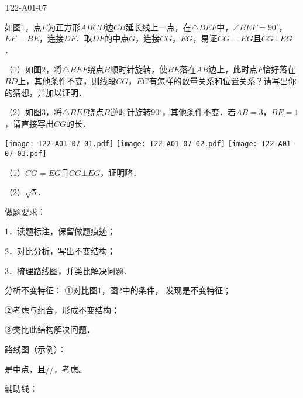 \begin{defproblem}{T22-A01-07}%
\begin{onlyproblem}%
如图1，点$E$为正方形$ABCD$边$ CB$延长线上一点，在$\triangle BEF$中，$\angle BEF=90^{\circ }$，$EF=BE$，连接$DF$．取$DF$的中点$G$，连接$CG$，$EG$，易证$CG=EG$且$CG\bot EG$．

（1）如图2，将$\triangle BEF$绕点$B$顺时针旋转，使$BE$落在$AB$边上，此时点$F$恰好落在$BD$上，其他条件不变，则线段$CG$，$EG$有怎样的数量关系和位置关系？请写出你的猜想，并加以证明．

（2）如图3，将$\triangle BEF$绕点$B$逆时针旋转90$^{\circ }$，其他条件不变．若$AB=3$，$BE=1$，请直接写出$CG$的长．

\begin{center}
\texttt{[image: T22-A01-07-01.pdf]}\qquad
\texttt{[image: T22-A01-07-02.pdf]}\qquad
\texttt{[image: T22-A01-07-03.pdf]}
\end{center}



\end{onlyproblem}%
\begin{onlysolution}%
（1）$CG=EG$且$CG \bot  EG$，证明略．

（2）$\sqrt 5 $．

做题要求：

1．读题标注，保留做题痕迹；

2．对比分析，写出不变结构；

3．梳理路线图，并类比解决问题．

分析不变特征：
①对比图1，图2中的条件，
发现\underline{\hspace*{2cm}}是不变特征；

②考虑\underline{\hspace*{2cm}}与\underline{\hspace*{2cm}}组合，形成不变结构；

③类比此结构解决问题．

路线图（示例）：

\underline{\hspace*{2cm}}是中点，且\underline{\hspace*{1cm}}//\underline{\hspace*{1cm}}，考虑\underline{\hspace*{2cm}}。

辅助线：


\begin{center}
\end{center}
\end{onlysolution}%
\end{defproblem}






